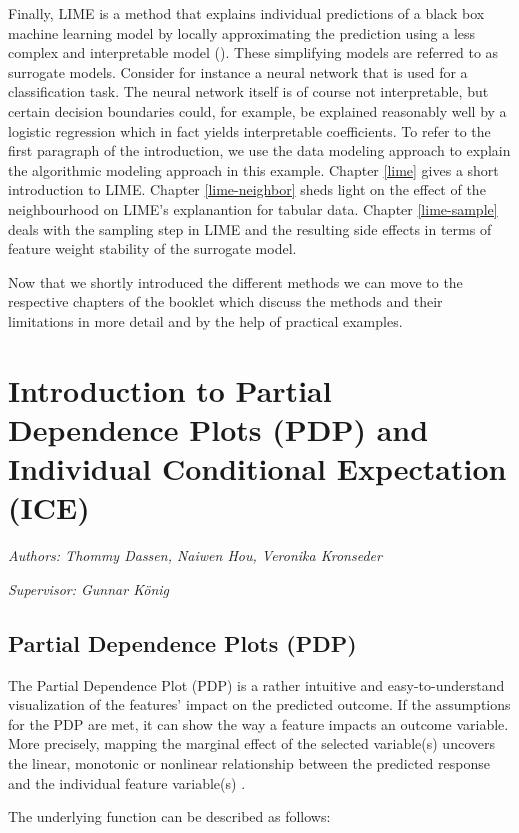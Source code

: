 \documentclass[]{krantz}
\begin{document}
Finally, LIME is a method that explains individual predictions of a
black box machine learning model by locally approximating the prediction
using a less complex and interpretable model (\citet{molnar2019}). These
simplifying models are referred to as surrogate models. Consider for
instance a neural network that is used for a classification task. The
neural network itself is of course not interpretable, but certain
decision boundaries could, for example, be explained reasonably well by
a logistic regression which in fact yields interpretable coefficients.
To refer to the first paragraph of the introduction, we use the data
modeling approach to explain the algorithmic modeling approach in this
example. Chapter \ref{lime} gives a short introduction to LIME. Chapter
\ref{lime-neighbor} sheds light on the effect of the neighbourhood on
LIME's explanantion for tabular data. Chapter \ref{lime-sample} deals
with the sampling step in LIME and the resulting side effects in terms
of feature weight stability of the surrogate model.

Now that we shortly introduced the different methods we can move to the
respective chapters of the booklet which discuss the methods and their
limitations in more detail and by the help of practical examples.

\chapter{Introduction to Partial Dependence Plots (PDP) and Individual
Conditional Expectation (ICE)}\label{pdp}

\emph{Authors: Thommy Dassen, Naiwen Hou, Veronika Kronseder}

\emph{Supervisor: Gunnar König}

\section{Partial Dependence Plots
(PDP)}\label{partial-dependence-plots-pdp}

The Partial Dependence Plot (PDP) is a rather intuitive and
easy-to-understand visualization of the features' impact on the
predicted outcome. If the assumptions for the PDP are met, it can show
the way a feature impacts an outcome variable. More precisely, mapping
the marginal effect of the selected variable(s) uncovers the linear,
monotonic or nonlinear relationship between the predicted response and
the individual feature variable(s) \citep{molnar2019}.

The underlying function can be described as follows:
\end{document}
